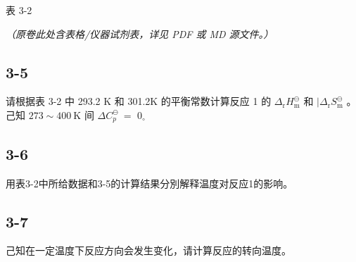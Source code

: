 表 3-2

\textit{（原卷此处含表格/仪器试剂表，详见 PDF 或 MD 源文件。）}

\subsection*{3-5}
请根据表 3-2 中 293.2 K 和 301.2K 的平衡常数计算反应 1 的 $\Delta _ { \mathrm { r } } H _ { \mathrm { m } } ^ { \ominus }$ 和 $| \Delta _ { \mathrm { { r } } } S _ { \mathrm { { m } } } ^ { \ominus }$ 。⼰知 $2 7 3 { \sim } 4 0 0 \ \mathrm { K }$ 间 $\Delta C _ { p } ^ { \ominus } \ =$ $0 _ { \circ }$

\subsection*{3-6}
⽤表3-2中所给数据和3-5的计算结果分別解释温度对反应1的影响。

\subsection*{3-7}
⼰知在⼀定温度下反应⽅向会发⽣变化，请计算反应的转向温度。
